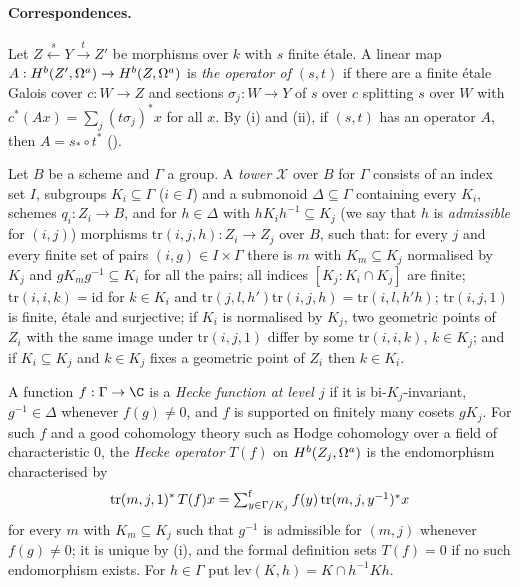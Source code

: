 \paragraph{Correspondences.} Let $Z\xleftarrow{s}Y\xrightarrow{t}Z'$ be morphisms over $k$ with $s$ finite \'etale.
A linear map $A:\ksoneH{Z'}{a}{b}\to\ksoneH{Z}{a}{b}$ is \emph{the operator of $(s,t)$} if there are a finite \'etale
Galois cover $c:W\to Z$ and sections $\sigma_j:W\to Y$ of $s$ over $c$ splitting $s$ over $W$ with
$c^*(Ax)=\sum_j(t\sigma_j)^*x$ for all $x$. By (i) and (ii), if $(s,t)$ has an operator $A$, then
$A=s_*\circ t^*$ ().

\begin{definition}[Towers]\label{pf:ks1:def-tower}
Let $B$ be a scheme and $\Gamma$ a group. A \emph{tower} $\mathcal X$ over $B$ for $\Gamma$ consists of an index set $I$,
subgroups $K_i\subseteq\Gamma$ ($i\in I$) and a submonoid $\Delta\subseteq\Gamma$ containing every $K_i$, schemes
$q_i:Z_i\to B$, and for $h\in\Delta$ with $hK_ih^{-1}\subseteq K_j$ (we say that $h$ is \emph{admissible} for
$(i,j)$) morphisms $\mathrm{tr}(i,j,h):Z_i\to Z_j$ over $B$, such that: for every $j$ and every finite set of pairs
$(i,g)\in I\times\Gamma$ there is $m$ with $K_m\subseteq K_j$ normalised by $K_j$ and $gK_mg^{-1}\subseteq K_i$
for all the pairs; all indices $[K_j:K_i\cap K_j]$ are finite; $\mathrm{tr}(i,i,k)=\mathrm{id}$ for $k\in K_i$ and
$\mathrm{tr}(j,l,h')\mathrm{tr}(i,j,h)=\mathrm{tr}(i,l,h'h)$; $\mathrm{tr}(i,j,1)$ is finite, \'etale and surjective;
if $K_i$ is normalised by $K_j$, two geometric points of $Z_i$ with the same image under $\mathrm{tr}(i,j,1)$ differ by
some $\mathrm{tr}(i,i,k)$, $k\in K_j$; and if $K_i\subseteq K_j$ and $k\in K_j$ fixes a geometric point of $Z_i$ then
$k\in K_i$.
\end{definition}

A function $f:\Gamma\to\C$ is a \emph{Hecke function at level $j$} if it is bi-$K_j$-invariant, $g^{-1}\in\Delta$
whenever $f(g)\neq0$, and $f$ is supported on finitely many cosets $gK_j$. For such $f$ and a good cohomology
theory such as Hodge cohomology over a field of characteristic $0$, the \emph{Hecke operator} $T(f)$ on
$\ksoneH{Z_j}{a}{b}$ is the endomorphism characterised by
\begin{equation}\label{pf:ks1:eq-hecke}
\mathrm{tr}(m,j,1)^*\,T(f)x=\ksonefs_{y\in\Gamma/K_j}f(y)\,\mathrm{tr}(m,j,y^{-1})^*x
\end{equation}
for every $m$ with $K_m\subseteq K_j$ such that $g^{-1}$ is admissible for $(m,j)$ whenever $f(g)\neq0$; it is
unique by (i), and the formal definition sets $T(f)=0$ if no such endomorphism exists. For $h\in\Gamma$ put
$\mathrm{lev}(K,h)=K\cap h^{-1}Kh$.

